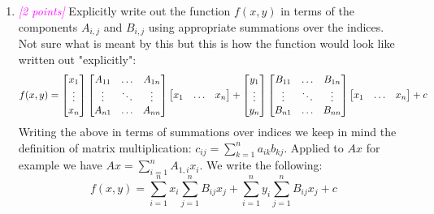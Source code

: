 \documentclass{article}
\newcommand{\1}{\mathbf{1}}
\newcommand{\points}[1]{\small\textcolor{magenta}{\emph{[#1 points]}} \normalsize}
\begin{document}
\begin{enumerate}
	\item \points{2} Explicitly write out the function $f(x, y)$ in terms of the components $A_{i,j}$ and $B_{i,j}$ using appropriate summations over the indices.\\
	Not sure what is meant by this but this is how the function would look like written out "explicitly":
	$$
	f(x, y) = 
	\begin{bmatrix} x_1  \\ \vdots \\ x_n \end{bmatrix} \begin{bmatrix} A_{11} & \hdots & A_{1n} \\ \vdots & \ddots & \vdots \\ A_{n1} & \hdots & A_{nn}\end{bmatrix} \begin{bmatrix} x_1  & \hdots & x_n \end{bmatrix} 
	+
	\begin{bmatrix} y_1  \\ \vdots \\ y_n \end{bmatrix} \begin{bmatrix} B_{11} & \hdots & B_{1n} \\ \vdots & \ddots & \vdots \\ B_{n1} & \hdots & B_{nn}\end{bmatrix} \begin{bmatrix} x_1  & \hdots & x_n \end{bmatrix} 
	+
	c \\
	$$
	Writing the above in terms of summations over indices we keep in mind the definition of matrix multiplication: $c_{ij} = \sum_{k=1}^n a_{ik}b_{kj}$. Applied to $Ax$ for example we have $Ax=\sum_{i=1}^n A_{1,i}x_i$. We write the following:
	$$ f(x, y) = \sum_{i=1}^n x_i \sum_{j=1}^n B_{ij}x_j + \sum_{i=1}^n y_i \sum_{j=1}^n B_{ij}x_j + c$$
	

\end{enumerate}
\end{document}
